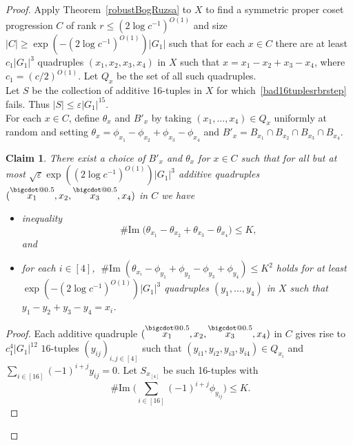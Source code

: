 \documentclass[a4paper,11pt]{article}
\makeatletter
\numberwithin{theorem}{section}
\newtheorem{claim}[theorem]{Claim}
\theoremstyle{definition}
\newcommand{\on}[1]{
	\operatorname{#1}
}
\newcommand\range{\on{\# Im}}
\newcommand*\bcdot{\mathpalette\bigcdot@{0.5}}
\newcommand*\bigcdot@[2]{\mathbin{\vcenter{\hbox{\scalebox{#2}{$\m@th#1\bullet$}}}}}
\newcommand{\upd}[1]{\overset{\bcdot}{#1}}
\makeatother
\begin{document}
\begin{proof}
    Apply Theorem~\ref{robustBogRuzsa} to $X$ to find a symmetric proper coset progression $C$ of rank $r \leq (2\log c^{-1})^{O(1)}$ and size $|C| \geq \exp(-(2\log c^{-1})^{O(1)})|G_1|$ such that for each $x \in C$ there are at least $c_1 |G_1|^3$ quadruples $(x_1, x_2, x_3, x_4)$ in $X$ such that $x = x_1 - x_2 + x_3 - x_4$, where $c_1 = (c/2)^{O(1)}$. Let $Q_x$ be the set of all such quadruples.\\
    \indent Let $S$ be the collection of additive 16-tuples in $X$ for which~\eqref{bad16tuplesrbrstep} fails. Thus $|S| \leq \varepsilon |G_1|^{15}$.\\
    \indent For each $x \in C$, define $\theta_x$ and $B'_x$ by taking $(x_1, \dots, x_4) \in Q_x$ uniformly at random and setting $\theta_x = \phi_{x_1} - \phi_{x_2} + \phi_{x_3} - \phi_{x_4}$ and $B'_x = B_{x_1} \cap B_{x_2} \cap B_{x_3} \cap B_{x_4}$.

    \begin{claim}\label{randomchoicethetadefinclaim}
        There exist a choice of $B'_x$ and $\theta_x$ for $x \in C$ such that for all but at most $\sqrt{\varepsilon} \exp((2\log c^{-1})^{O(1)}) |G_1|^3$ additive quadruples $(\upd{x_1}, x_2, \upd{x_3}, x_4)$ in $C$ we have
        \begin{itemize}
        \item[\textbf{(i)}] inequality
        \begin{equation}\range\Big(\theta_{x_1} - \theta_{x_2} + \theta_{x_3} - \theta_{x_4}\Big) \leq K, \label{phithetapsiK}\end{equation} and
        \item[\textbf{(ii)}] for each $i\in[4]$, $\range(\theta_{x_i} - \phi_{y_1} + \phi_{y_2} - \phi_{y_3} + \phi_{y_4}) \leq K^2$ holds for at least $\exp(-(2\log c^{-1})^{O(1)}) |G_1|^3$ quadruples $(y_1, \dots, y_4)$ in $X$ such that $y_1 - y_2 + y_3 - y_4 = x_i$.
        \end{itemize}
    \end{claim}

    \begin{proof}
        Each additive quadruple $(\upd{x_1}, x_2, \upd{x_3}, x_4)$ in $C$ gives rise to $c_1^4|G_1|^{12}$  $16$-tuples $(y_{ij})_{i,j \in [4]}$ such that $(y_{i1}, y_{i2}, y_{i3}, y_{i4}) \in Q_{x_i}$ and $\sum_{i \in [16]} (-1)^{i + j} y_{ij} = 0$. Let $S_{x_{[4]}}$ be such 16-tuples with
        \[\range\Big(\sum_{i \in [16]} (-1)^{i + j} \phi_{y_{ij}}\Big) \leq K.\]


\end{proof}
\end{proof}
\end{document}
